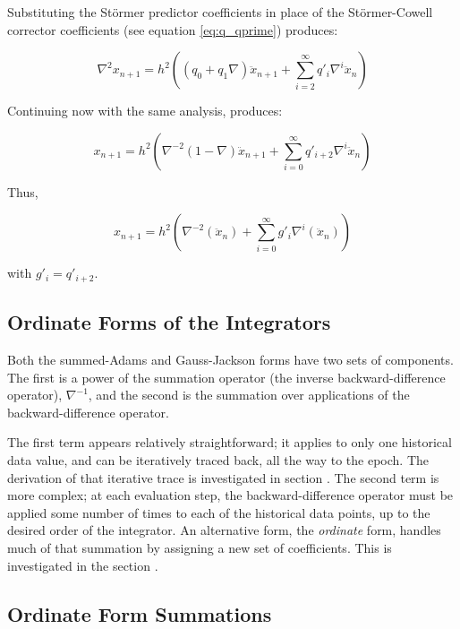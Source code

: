 Substituting the St\"ormer predictor coefficients in place of the 
St\"ormer-Cowell
corrector coefficients (see equation \ref{eq:q_qprime}) produces:

\begin{equation*}
\nabla ^{2}x_{n+1}=h^{2}\left(\left(q_0+q_1 \nabla \right) \ddot x_{n+1} + 
\sum _{i=2}^{\infty
}q'_{i}\nabla ^{i}{\ddot{x}}_{n}\right)
\end{equation*}

Continuing now with the same analysis, produces:

\begin{equation*}
x_{n+1} = h^{2}\left(\nabla ^{-2}(1-\nabla){\ddot{x}}_{n+1} + 
\sum_{i=0}^{\infty} q'_{i+2}\nabla ^{i}{\ddot{x}}_{n} \right)
\end{equation*}

Thus,

\begin{equation}
x_{n+1} = h^{2}\left(\nabla ^{-2}({\ddot{x}}_{n})+\sum _{i=0}^{\infty
}g'_{i}\nabla ^{i}({\ddot{x}}_{n})\right)
\end{equation}

with  $g'_{i}=q'_{i+2}$.


\subsection{Ordinate Forms of the Integrators}

Both the summed-Adams and Gauss-Jackson forms have two sets of
components. The first is a power of the summation operator 
(the inverse backward-difference operator),  $\nabla ^{-1}$, and the
second is the summation over applications of the backward-difference
operator.

The first term appears relatively straightforward; it applies to only one
historical data value, and can be iteratively traced back, all the way
to the epoch.  The derivation of that iterative trace is investigated in section
.
The second term is more complex; at each evaluation
step, the backward-difference operator must be applied some number of
times to each of the historical data points, up to the desired order of
the integrator. An alternative form, the \textit{ordinate} form,
handles much of that summation by assigning a new set of coefficients.
This is investigated in the section 
.


\subsection{Ordinate Form Summations}\label{sec:ordinate_form_summations}

